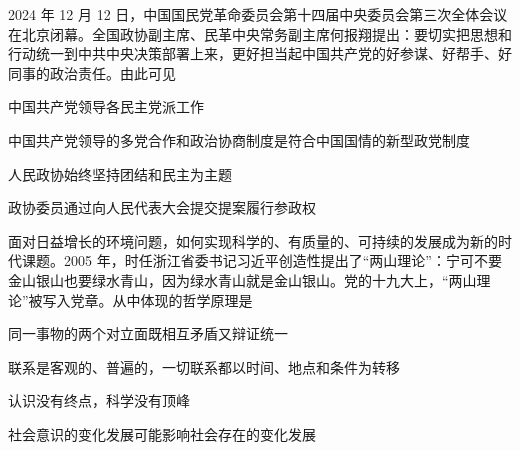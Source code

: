 \documentclass{exam-zh}
\begin{document}
\begin{question}
  2024 年 12 月 12 日，中国国民党革命委员会第十四届中央委员会第三次全体会议在北京闭幕。全国政协副主席、民革中央常务副主席何报翔提出：要切实把思想和行动统一到中共中央决策部署上来，更好担当起中国共产党的好参谋、好帮手、好同事的政治责任。由此可见

   中国共产党领导各民主党派工作

   中国共产党领导的多党合作和政治协商制度是符合中国国情的新型政党制度

   人民政协始终坚持团结和民主为主题

   政协委员通过向人民代表大会提交提案履行参政权

  \begin{choices}
  \item {}
  \item {}
  \item {}
  \item {}
  \end{choices}
\end{question}

\begin{question}
  面对日益增长的环境问题，如何实现科学的、有质量的、可持续的发展成为新的时代课题。2005 年，时任浙江省委书记习近平创造性提出了“两山理论”：宁可不要金山银山也要绿水青山，因为绿水青山就是金山银山。党的十九大上，“两山理论”被写入党章。从中体现的哲学原理是

   同一事物的两个对立面既相互矛盾又辩证统一

   联系是客观的、普遍的，一切联系都以时间、地点和条件为转移

   认识没有终点，科学没有顶峰

   社会意识的变化发展可能影响社会存在的变化发展

  \begin{choices}
  \item {}
  \item {}
  \item {}
  \item {}
  \end{choices}
\end{question}
\end{document}
